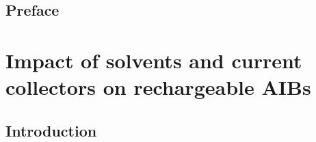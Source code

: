 \section*{Preface}

\pagebreak

\chapter{Impact of solvents and current collectors on rechargeable AIBs} %
\label{chap7} %

\section{Introduction}

